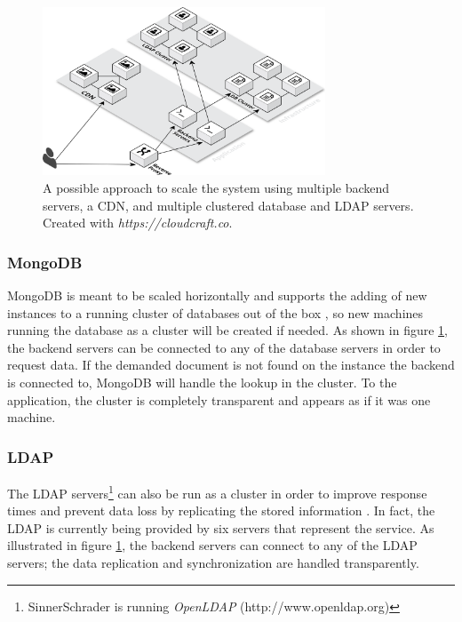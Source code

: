 \begin{figure}[!htp]
    \centering
    \includegraphics[width=0.75\textwidth]{images/system_architecture_scaled.png}
    \caption[Illustration: Scaled System Architecture]{A possible approach to scale the system using multiple backend servers, a CDN, and multiple clustered database and LDAP servers. Created with \textit{https://cloudcraft.co}.}
    \label{scaleup}
\end{figure}

\newpage

\subsubsection{MongoDB}
MongoDB is meant to be scaled horizontally and supports the adding of new instances to a running cluster of databases out of the box \cite[p. 19]{MongoGuide}, so new machines running the database as a cluster will be created if needed. As shown in figure \ref{scaleup}, the backend servers can be connected to any of the database servers in order to request data. If the demanded document is not found on the instance the backend is connected to, MongoDB will handle the lookup in the cluster. To the application, the cluster is completely transparent and appears as if it was one machine.

\subsubsection{LDAP}
The LDAP servers\footnote{SinnerSchrader is running \textit{OpenLDAP} (http://www.openldap.org)} can also be run as a cluster in order to improve response times and prevent data loss by replicating the stored information \cite{ldapscale}. In fact, the LDAP is currently being provided by six servers that represent the service. As illustrated in figure \ref{scaleup}, the backend servers can connect to any of the LDAP servers; the data replication and synchronization are handled transparently.

